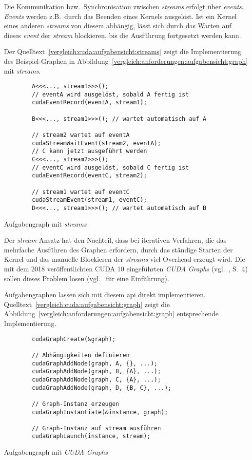 Die Kommunikation bzw.\ Synchronisation zwischen \textit{streams} erfolgt über
\textit{events}. \textit{Events} werden z.B.\ durch das Beenden eines Kernels
ausgelöst. Ist ein Kernel eines anderen \textit{streams} von diesem abhängig,
lässt sich durch das Warten auf dieses \textit{event} der \textit{stream}
blockieren, bis die Ausführung fortgesetzt werden kann.

Der Quelltext~\ref{vergleich:cuda:aufgabensicht:streams} zeigt die
Implementierung des Beispiel-Graphen
in Abbildung~\ref{vergleich:anforderungen:aufgabensicht:graph} mit
\textit{streams}.

\begin{code}
    \begin{verbatim}
        A<<<..., stream1>>>();
        // eventA wird ausgelöst, sobald A fertig ist
        cudaEventRecord(eventA, stream1);

        B<<<..., stream1>>>(); // wartet automatisch auf A

        // stream2 wartet auf eventA
        cudaStreamWaitEvent(stream2, eventA);
        // C kann jetzt ausgeführt werden
        C<<<..., stream2>>>();
        // eventC wird ausgelöst, sobald C fertig ist
        cudaEventRecord(eventC, stream2);

        // stream1 wartet auf eventC
        cudaStreamEvent(stream1, eventC);
        D<<<..., stream1>>>(); // wartet automatisch auf B
    \end{verbatim}
    \caption{Aufgabengraph mit \textit{streams}}
    \label{vergleich:cuda:aufgabensicht:streams}
\end{code}

Der \textit{stream}-Ansatz hat den Nachteil, dass bei iterativen Verfahren, die
das mehrfache Ausführen des Graphen erfordern, durch das ständige Starten der
Kernel und das manuelle Blockieren der \textit{streams} viel Overhead erzeugt
wird. Die mit dem 2018 veröffentlichten CUDA 10 eingeführten
\textit{CUDA Graphs} (vgl.~\cite{cuda10rel}, S.\ 4) sollen dieses Problem lösen
(vgl.~\cite{ramarao2018} für eine Einführung).

Aufgabengraphen lassen sich mit diesem \gls{api} direkt implementieren.
Quelltext~\ref{vergleich:cuda:aufgabensicht:graph} zeigt die
Abbildung~\ref{vergleich:anforderungen:aufgabensicht:graph} entsprechende
Implementierung. 

\begin{code}
    \begin{verbatim}
        cudaGraphCreate(&graph);

        // Abhängigkeiten definieren
        cudaGraphAddNode(graph, A, {}, ...);
        cudaGraphAddNode(graph, B, {A}, ...);
        cudaGraphAddNode(graph, C, {A}, ...);
        cudaGraphAddNode(graph, D, {B, C}, ...);

        // Graph-Instanz erzeugen
        cudaGraphInstantiate(&instance, graph);

        // Graph-Instanz auf stream ausführen
        cudaGraphLaunch(instance, stream);
    \end{verbatim}
    \caption{Aufgabengraph mit \textit{CUDA Graphs}}
    \label{vergleich:cuda:aufgabensicht:graph}
\end{code}

